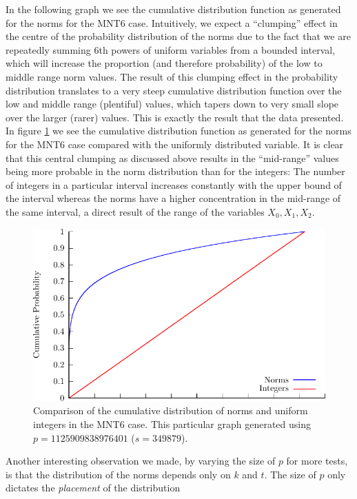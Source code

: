 \documentclass[a4paper, 10pt, envcountsect, runningheads]{article}
\numberwithin{figure}{section}
\numberwithin{equation}{section}
\begin{document}
In the following graph we see the cumulative distribution function as generated for the norms for the MNT6 case. Intuitively, we expect a ``clumping'' effect in the centre of the probability distribution of the norms due to the fact that we are repeatedly summing 6th powers of uniform variables from a bounded interval, which will increase the proportion (and therefore probability) of the low to middle range norm values. The result of this clumping effect in the probability distribution translates to a very steep cumulative distribution function over the low and middle range (plentiful) values, which tapers down to very small slope over the larger (rarer) values. This is exactly the result that the data presented. In figure \ref{fig:comp} we see the cumulative distribution function as generated for the norms for the MNT6 case compared with the uniformly distributed variable.
It is clear that this central clumping as discussed above results in the ``mid-range'' values being more probable in the norm distribution than for the integers: The number of integers in a particular interval increases constantly with the upper bound of the interval whereas the norms have a higher concentration in the mid-range of the same interval, a direct result of the range of the variables $X_0,X_1,X_2$. 
\begin{center}
\begin{figure}\label{fig:comp}
\includegraphics[scale=1]{graphs/cumulative}\caption{Comparison of the cumulative distribution of norms and uniform integers in the MNT6 case. This particular graph generated using $p=1125909838976401$ ($s=349879$).}
\end{figure}
\end{center}
Another interesting observation we made, by varying the size of $p$ for more tests, is that the distribution of the norms depends only on $k$ and $t$. The size of $p$ only dictates the \textit{placement} of the distribution %
\end{document}
